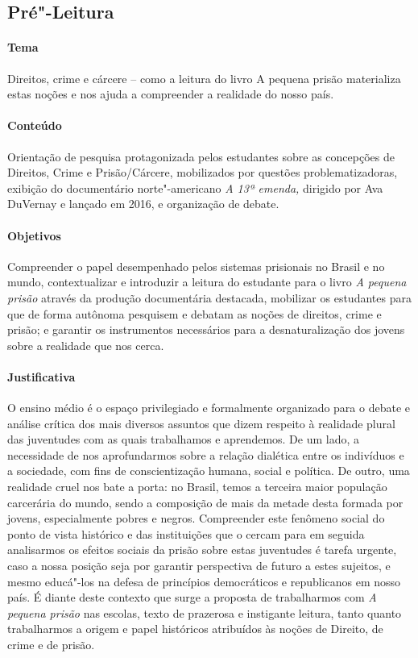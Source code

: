 \documentclass[11pt]{extarticle}
\begin{document}
\subsection{Pré"-Leitura}

\paragraph{Tema} Direitos, crime e cárcere -- como a leitura do livro A
pequena prisão materializa estas noções e nos ajuda a compreender a
realidade do nosso país.

\paragraph{Conteúdo} Orientação de pesquisa protagonizada pelos estudantes
sobre as concepções de Direitos, Crime e Prisão/Cárcere, mobilizados por
questões problematizadoras, exibição do documentário norte"-americano
\emph{A 13ª emenda,} dirigido por Ava DuVernay e lançado em 2016, e
organização de debate.

\paragraph{Objetivos} Compreender o papel desempenhado pelos sistemas
prisionais no Brasil e no mundo, contextualizar e introduzir a leitura do
estudante para o livro \emph{A pequena prisão} através da produção
documentária destacada, mobilizar os estudantes para que de forma
autônoma pesquisem e debatam as noções de direitos, crime e prisão; e
garantir os instrumentos necessários para a desnaturalização dos jovens
sobre a realidade que nos cerca.

\paragraph{Justificativa} O ensino médio é o espaço privilegiado e
formalmente organizado para o debate e análise crítica dos mais diversos
assuntos que dizem respeito à realidade plural das juventudes com as
quais trabalhamos e aprendemos. De um lado, a necessidade de nos
aprofundarmos sobre a relação dialética entre os indivíduos e a
sociedade, com fins de conscientização humana, social e política. De
outro, uma realidade cruel nos bate a porta: no Brasil, temos a terceira
maior população carcerária do mundo, sendo a composição de mais da
metade desta formada por jovens, especialmente pobres e negros.
Compreender este fenômeno social do ponto de vista histórico e das
instituições que o cercam para em seguida analisarmos os efeitos sociais
da prisão sobre estas juventudes é tarefa urgente, caso a nossa posição
seja por garantir perspectiva de futuro a estes sujeitos, e mesmo
educá"-los na defesa de princípios democráticos e republicanos em nosso
país. É diante deste contexto que surge a proposta de trabalharmos com
\emph{A pequena prisão} nas escolas, texto de prazerosa e instigante
leitura, tanto quanto trabalharmos a origem e papel históricos
atribuídos às noções de Direito, de crime e de prisão.
\end{document}
